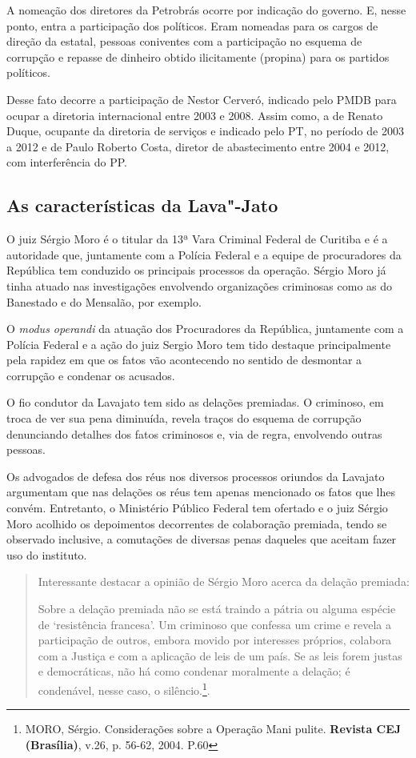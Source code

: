 {A nomeação dos diretores da Petrobrás ocorre por indicação do governo.
E, nesse ponto, entra a participação dos políticos. Eram nomeadas para
os cargos de direção da estatal, pessoas coniventes com a participação
no esquema de corrupção e repasse de dinheiro obtido ilicitamente
(propina) para os partidos políticos.

Desse fato decorre a participação de Nestor Cerveró, indicado pelo PMDB
para ocupar a diretoria internacional entre 2003 e 2008. Assim como, a
de Renato Duque, ocupante da diretoria de serviços e indicado pelo PT,
no período de 2003 a 2012 e de Paulo Roberto Costa, diretor de
abastecimento entre 2004 e 2012, com interferência do PP.

\subsection{As características da Lava"-Jato}

O juiz Sérgio Moro é o titular da 13ª Vara Criminal Federal de Curitiba
e é a autoridade que, juntamente com a Polícia Federal e a equipe de
procuradores da República tem conduzido os principais processos da
operação. Sérgio Moro já tinha atuado nas investigações envolvendo
organizações criminosas como as do Banestado e do Mensalão, por exemplo.

O \emph{modus operandi} da atuação dos Procuradores da República,
juntamente com a Polícia Federal e a ação do juiz Sergio Moro tem tido
destaque principalmente pela rapidez em que os fatos vão acontecendo no
sentido de desmontar a corrupção e condenar os acusados.

O fio condutor da Lavajato tem sido as delações premiadas. O criminoso,
em troca de ver sua pena diminuída, revela traços do esquema de
corrupção denunciando detalhes dos fatos criminosos e, via de regra,
envolvendo outras pessoas.

Os advogados de defesa dos réus nos diversos processos oriundos da
Lavajato argumentam que nas delações os réus tem apenas mencionado os
fatos que lhes convém. Entretanto, o Ministério Público Federal tem
ofertado e o juiz Sérgio Moro acolhido os depoimentos decorrentes de
colaboração premiada, tendo se observado inclusive, a comutações de
diversas penas daqueles que aceitam fazer uso do instituto.

\begin{quote}
Interessante destacar a opinião de Sérgio Moro acerca da delação
premiada:

Sobre a delação premiada não se está traindo a pátria ou alguma espécie
de `resistência francesa'. Um criminoso que confessa um crime e revela a
participação de outros, embora movido por interesses próprios, colabora
com a Justiça e com a aplicação de leis de um país. Se as leis forem
justas e democráticas, não há como condenar moralmente a delação; é
condenável, nesse caso, o silêncio.\footnote{MORO, Sérgio. Considerações
  sobre a Operação Mani pulite. \textbf{Revista CEJ (Brasília)}, v.26,
  p. 56-62, 2004. P.60}.
\end{quote}

}
